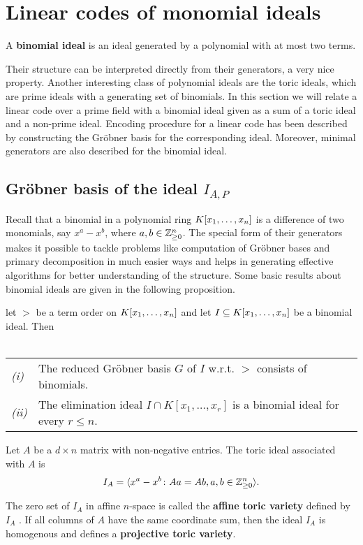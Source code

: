 \documentclass[english,bachelor]{liumaiex}
\begin{document}
\section{Linear codes of monomial ideals}
\begin{define}
A \textbf{binomial ideal} is an ideal generated by a polynomial with at most two terms.
\end{define}
Their structure can be interpreted directly from their generators, a very nice property. Another interesting class of polynomial ideals are the toric ideals, which are prime ideals with a generating set of binomials. In this section we will relate a linear code over a prime field with a binomial ideal given as a sum of a toric ideal and a non-prime ideal. Encoding procedure for a linear code has been described by constructing the Gröbner basis for the corresponding ideal. Moreover, minimal generators are also described for the binomial ideal.
\subsection{Gröbner basis of the ideal $I_{A,P}$}
Recall that a binomial in a polynomial ring $K[x_1,\dots, x_n]$ is a difference of two monomials, say $x^a-x^b$, where $a,b\in\mathbb{Z}_{\geq 0}^n$. The special form of their generators makes it possible to tackle problems like computation of Gröbner bases and primary decomposition in much easier ways and helps in generating effective algorithms for better understanding of the structure. Some basic results about binomial ideals are given in the following proposition.
\begin{prop}
let $>$ be a term order on $K[x_1,\dots, x_n]$ and let $I\subseteq K[x_1,\dots, x_n]$ be a binomial ideal. Then\\ \\
\begin{tabular}{ll}
\emph{(i)} & The reduced Gröbner basis $G$ of $I$ w.r.t. $>$ consists of binomials.\\
\emph{(ii)} & The elimination ideal $I\cap K[x_1,\dots,x_r]$ is a binomial ideal for every $r\leq n$.
\end{tabular}
Let $A$ be a $d\times n$ matrix with non-negative entries. The toric ideal associated with $A$ is
\begin{displaymath}
I_A=\langle x^a-x^b\colon Aa=Ab, a,b\in\mathbb{Z}_{\geq 0}^n\rangle.
\end{displaymath}
\end{prop}

\begin{define}
The zero set of $I_A$ in affine $n$-space is called the \textbf{affine toric variety} defined by $I_A$ \cite{fulton}. If all columns of $A$ have the same coordinate sum, then the ideal $I_A$ is homogenous and defines a \textbf{projective toric variety}.
\end{define}
\end{document}
